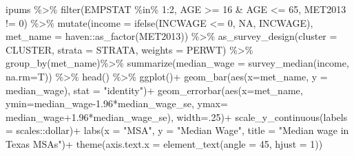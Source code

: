\documentclass[
  letterpaper,
  DIV=11,
  numbers=noendperiod]{scrreprt}
\newenvironment{Shaded}{\begin{snugshade}}{\end{snugshade}}
\newcommand{\AttributeTok}[1]{\textcolor[rgb]{0.40,0.45,0.13}{#1}}
\newcommand{\ConstantTok}[1]{\textcolor[rgb]{0.56,0.35,0.01}{#1}}
\newcommand{\DecValTok}[1]{\textcolor[rgb]{0.68,0.00,0.00}{#1}}
\newcommand{\FloatTok}[1]{\textcolor[rgb]{0.68,0.00,0.00}{#1}}
\newcommand{\FunctionTok}[1]{\textcolor[rgb]{0.28,0.35,0.67}{#1}}
\newcommand{\NormalTok}[1]{\textcolor[rgb]{0.00,0.23,0.31}{#1}}
\newcommand{\SpecialCharTok}[1]{\textcolor[rgb]{0.37,0.37,0.37}{#1}}
\newcommand{\StringTok}[1]{\textcolor[rgb]{0.13,0.47,0.30}{#1}}
\begin{document}
\begin{Shaded}
\begin{Highlighting}[]
\NormalTok{ipums }\SpecialCharTok{\%\textgreater{}\%}
  \FunctionTok{filter}\NormalTok{(EMPSTAT }\SpecialCharTok{\%in\%} \DecValTok{1}\SpecialCharTok{:}\DecValTok{2}\NormalTok{,}
\NormalTok{         AGE }\SpecialCharTok{\textgreater{}=} \DecValTok{16} \SpecialCharTok{\&}\NormalTok{ AGE }\SpecialCharTok{\textless{}=} \DecValTok{65}\NormalTok{, }
\NormalTok{         MET2013 }\SpecialCharTok{!=} \DecValTok{0}\NormalTok{) }\SpecialCharTok{\%\textgreater{}\%}
  \FunctionTok{mutate}\NormalTok{(}\AttributeTok{income =} \FunctionTok{ifelse}\NormalTok{(INCWAGE }\SpecialCharTok{\textless{}=} \DecValTok{0}\NormalTok{, }\ConstantTok{NA}\NormalTok{, INCWAGE),}
         \AttributeTok{met\_name =}\NormalTok{ haven}\SpecialCharTok{::}\FunctionTok{as\_factor}\NormalTok{(MET2013)) }\SpecialCharTok{\%\textgreater{}\%}
  \FunctionTok{as\_survey\_design}\NormalTok{(}\AttributeTok{cluster =}\NormalTok{ CLUSTER,}
                   \AttributeTok{strata =}\NormalTok{ STRATA,}
                   \AttributeTok{weights =}\NormalTok{ PERWT) }\SpecialCharTok{\%\textgreater{}\%}
  \FunctionTok{group\_by}\NormalTok{(met\_name)}\SpecialCharTok{\%\textgreater{}\%}
  \FunctionTok{summarize}\NormalTok{(}\AttributeTok{median\_wage =} \FunctionTok{survey\_median}\NormalTok{(income, }\AttributeTok{na.rm=}\NormalTok{T)) }\SpecialCharTok{\%\textgreater{}\%}  
  \FunctionTok{head}\NormalTok{() }\SpecialCharTok{\%\textgreater{}\%}
  \FunctionTok{ggplot}\NormalTok{()}\SpecialCharTok{+}
  \FunctionTok{geom\_bar}\NormalTok{(}\FunctionTok{aes}\NormalTok{(}\AttributeTok{x=}\NormalTok{met\_name, }\AttributeTok{y =}\NormalTok{ median\_wage), }\AttributeTok{stat =} \StringTok{"identity"}\NormalTok{)}\SpecialCharTok{+}
  \FunctionTok{geom\_errorbar}\NormalTok{(}\FunctionTok{aes}\NormalTok{(}\AttributeTok{x=}\NormalTok{met\_name,}
                    \AttributeTok{ymin=}\NormalTok{median\_wage}\FloatTok{{-}1.96}\SpecialCharTok{*}\NormalTok{median\_wage\_se,}
                    \AttributeTok{ymax=}\NormalTok{ median\_wage}\FloatTok{+1.96}\SpecialCharTok{*}\NormalTok{median\_wage\_se),}
                \AttributeTok{width=}\NormalTok{.}\DecValTok{25}\NormalTok{)}\SpecialCharTok{+}
  \FunctionTok{scale\_y\_continuous}\NormalTok{(}\AttributeTok{labels =}\NormalTok{ scales}\SpecialCharTok{::}\NormalTok{dollar)}\SpecialCharTok{+}
  \FunctionTok{labs}\NormalTok{(}\AttributeTok{x =} \StringTok{"MSA"}\NormalTok{, }
       \AttributeTok{y =} \StringTok{"Median Wage"}\NormalTok{,}
       \AttributeTok{title =} \StringTok{"Median wage in Texas MSAs"}\NormalTok{)}\SpecialCharTok{+}
  \FunctionTok{theme}\NormalTok{(}\AttributeTok{axis.text.x =} \FunctionTok{element\_text}\NormalTok{(}\AttributeTok{angle =} \DecValTok{45}\NormalTok{, }\AttributeTok{hjust =} \DecValTok{1}\NormalTok{))}
\end{Highlighting}
\end{Shaded}
\end{document}

